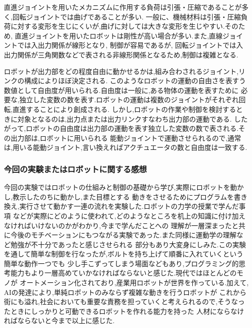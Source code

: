 \documentclass[a4paper,11pt]{jsarticle}
\begin{document}
直進ジョイントを用いたメカニズムに作用する負荷は引張・圧縮であることが多く,回転ジョイントでは曲げであることが多い.
一般に、機械材料は引張・圧縮負荷に対する変形を生じにくいが,曲げに対しては大きな変形を生じやすい.そのため,
直進ジョイントを用いたロボットは剛性が高い場合が多い.また,直線ジョイントでは入出力関係が線形となり, 制御が容易であるが,
回転ジョイントでは入出力関係が三角関数などで表される非線形関係となるため,制御は複雑となる.
\par
ロボットが出力部をどの程度自由に動かせるかは,組み合わされるジョイント,リンクの構成によりほぼ決定される.
このようなロボットの運動の自由さを表すう数値として自由度が用いられる.自由度は一般に,ある物体の運動を表すために
必要な,独立した変数の数を表す.ロボットの運動は複数のジョイントがそれぞれ回転,直進することにより創成される.
しかし,ロボットの作業や制御を検討するときに対象となるのは,出力点または出力リンクすなわち出力部の運動である.
したがって,ロボットの自由度は出力部の運動を表す独立した変数の数で表される.その出力部は,ロボットに用いられる
能動ジョイントで運動させられるので,通常は,用いる能動ジョイント,言い換えればアクチュエータの数と自由度は一致する.

\subsubsection{今回の実験またはロボットに関する感想}
今回の実験ではロボットの仕組みと制御の基礎から学び,実際にロボットを動かし,教示したのちに動かし,また目標とする
動きをさせるためにプログラムを書き換え,実行させて動かす一連の流れを実験した.ロボットの力学の授業で学んだ事項
などが実際にどのように使われて,どのようなところを机上の知識に付け加えなければいけないのかがわかり,今まで学んだことへの
理解が一層深まったと共に今後のモチベーションにもつながる実験であった.また同様に運動学の理解など勉強が不十分であったと感じさせられる
部分もあり大変身にしみた.この実験を通して簡単な制御を行なったが,ボルトを持ち上げて順番に入れていくという簡単な動作一つでも
少し手こずってしまう場面などもあり,プログラミング的思考能力もより一層高めていかなければならないと感じた.現代ではほとんどのモノが
オートメーション化されており,産業用ロボットが世界を作っている.加えて, AIの発達により,単純ロボットのみならず複雑な動きを行うロボットが
これから街にも溢れ,社会においても重要な責務を担っていくと考えられるので,そうなったときにしっかりと可動できるロボットを作れる能力を持った
人材にならなければならないと今まで以上に感じた.
\end{document}
